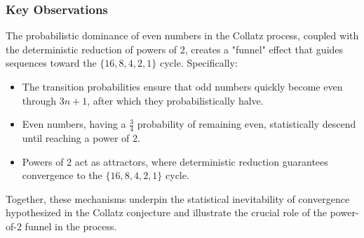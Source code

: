 \subsubsection{Key Observations}
The probabilistic dominance of even numbers in the Collatz process, coupled with the deterministic reduction of powers of 2, creates a "funnel" effect that guides sequences toward the \( \{16, 8, 4, 2, 1\} \) cycle. Specifically:
\begin{itemize}
    \item The transition probabilities ensure that odd numbers quickly become even through \( 3n + 1 \), after which they probabilistically halve.
    \item Even numbers, having a \( \frac{3}{4} \) probability of remaining even, statistically descend until reaching a power of 2.
    \item Powers of 2 act as attractors, where deterministic reduction guarantees convergence to the \( \{16, 8, 4, 2, 1\} \) cycle.
\end{itemize}

Together, these mechanisms underpin the statistical inevitability of convergence hypothesized in the Collatz conjecture and illustrate the crucial role of the power-of-2 funnel in the process.
